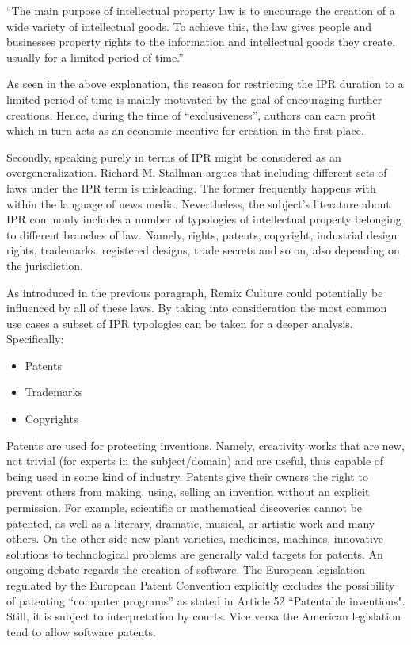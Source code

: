 \begin{displayquote}
“The main purpose of intellectual property law is to encourage the creation of a wide variety of intellectual goods. To achieve this, the law gives people and businesses property rights to the information and intellectual goods they create, usually for a limited period of time.”
\end{displayquote}

As seen in the above explanation, the reason for restricting the IPR duration to a limited period of time is mainly motivated by the goal of encouraging further creations. Hence, during the time of “exclusiveness”, authors can earn profit which in turn acts as an economic incentive for creation in the first place.

Secondly, speaking purely in terms of IPR might be considered as an overgeneralization. Richard M. Stallman argues that including different sets of laws under the IPR term is misleading. The former frequently happens with within the language of news media. Nevertheless, the subject’s literature about IPR commonly includes a number of typologies of intellectual property belonging to different branches of law. Namely, rights, patents, copyright, industrial design rights, trademarks, registered designs, trade secrets and so on, also depending on the jurisdiction.

As introduced in the previous paragraph, Remix Culture could potentially be influenced by all of these laws. By taking into consideration the most common use cases a subset of IPR typologies can be taken for a deeper analysis. Specifically:

\begin{itemize}
\item Patents
\item Trademarks
\item Copyrights 
\end{itemize}

Patents are used for protecting inventions. Namely, creativity works that are new, not trivial (for experts in the subject/domain) and are useful, thus capable of being used in some kind of industry. Patents give their owners the right to prevent others from making, using, selling an invention without an explicit permission. For example, scientific or mathematical discoveries cannot be patented, as well as a literary, dramatic, musical, or artistic work and many others. On the other side new plant varieties, medicines, machines, innovative solutions to technological problems are generally valid targets for patents.
An ongoing debate regards the creation of software. The European legislation regulated by the European Patent Convention explicitly excludes the possibility of patenting “computer programs” as stated in Article 52 “Patentable inventions". Still, it is subject to interpretation by courts. Vice versa the American legislation tend to allow software patents.

